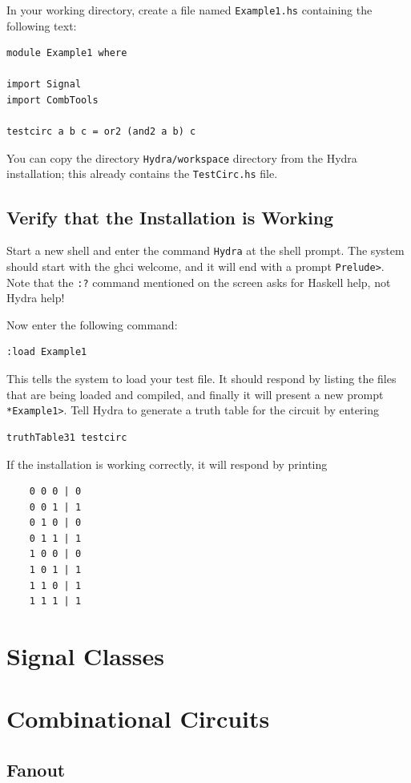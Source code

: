 \documentclass[a4paper,openany,fleqn]{book}
\begin{document}
In your working directory, create a file named \texttt{Example1.hs}
containing the following text:
\begin{verbatim}
module Example1 where

import Signal
import CombTools

testcirc a b c = or2 (and2 a b) c
\end{verbatim}
You can copy the directory \texttt{Hydra/workspace} directory from the
Hydra installation; this already contains the \texttt{TestCirc.hs}
file.

\section{Verify that the Installation is Working}
\label{sec:check-installation}

Start a new shell and enter the command \texttt{Hydra} at the shell
prompt.  The system should start with the ghci welcome, and it will
end with a prompt \texttt{Prelude>}.  Note that the \texttt{:?}
command mentioned on the screen asks for Haskell help, not Hydra help!

Now enter the following command:
\begin{verbatim}
:load Example1
\end{verbatim}
This tells the system to load your test file. It should respond by
listing the files that are being loaded and compiled, and finally it
will present a new prompt \texttt{*Example1>}.  Tell Hydra to generate
a truth table for the circuit by entering
\begin{verbatim}
truthTable31 testcirc
\end{verbatim}
If the installation is working correctly, it will respond by printing
\begin{verbatim}
    0 0 0 | 0
    0 0 1 | 1
    0 1 0 | 0
    0 1 1 | 1
    1 0 0 | 0
    1 0 1 | 1
    1 1 0 | 1
    1 1 1 | 1
\end{verbatim}


\chapter{Signal Classes}
\label{sec:app-signal-classes}

\chapter{Combinational Circuits}
\label{sec:app-comb-circ}

\section{Fanout}
\label{sec:app-fanout}
\end{document}
